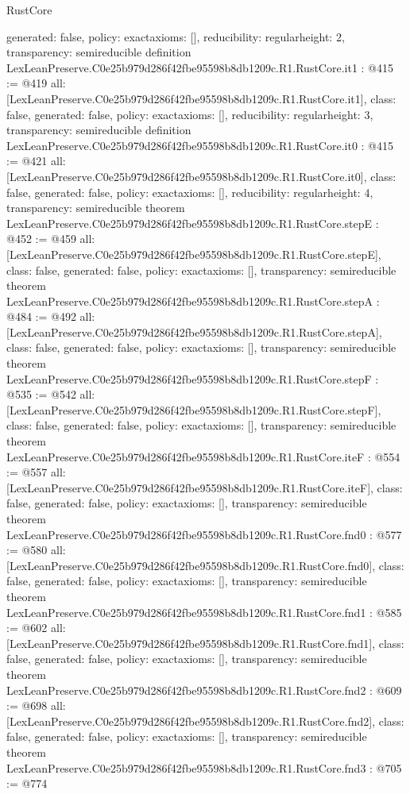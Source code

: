 \begin{lexlean}{RustCore}
\begin{coremodule}
{  generated: false,
  policy: exact{axioms: []},
  reducibility: regular{height: 2},
  transparency: semireducible
}
definition LexLeanPreserve.C0e25b979d286f42fbe95598b8db1209c.R1.RustCore.it1 : @415 := @419 {
  all: [LexLeanPreserve.C0e25b979d286f42fbe95598b8db1209c.R1.RustCore.it1],
  class: false,
  generated: false,
  policy: exact{axioms: []},
  reducibility: regular{height: 3},
  transparency: semireducible
}
definition LexLeanPreserve.C0e25b979d286f42fbe95598b8db1209c.R1.RustCore.it0 : @415 := @421 {
  all: [LexLeanPreserve.C0e25b979d286f42fbe95598b8db1209c.R1.RustCore.it0],
  class: false,
  generated: false,
  policy: exact{axioms: []},
  reducibility: regular{height: 4},
  transparency: semireducible
}
theorem LexLeanPreserve.C0e25b979d286f42fbe95598b8db1209c.R1.RustCore.stepE : @452 := @459 {
  all: [LexLeanPreserve.C0e25b979d286f42fbe95598b8db1209c.R1.RustCore.stepE],
  class: false,
  generated: false,
  policy: exact{axioms: []},
  transparency: semireducible
}
theorem LexLeanPreserve.C0e25b979d286f42fbe95598b8db1209c.R1.RustCore.stepA : @484 := @492 {
  all: [LexLeanPreserve.C0e25b979d286f42fbe95598b8db1209c.R1.RustCore.stepA],
  class: false,
  generated: false,
  policy: exact{axioms: []},
  transparency: semireducible
}
theorem LexLeanPreserve.C0e25b979d286f42fbe95598b8db1209c.R1.RustCore.stepF : @535 := @542 {
  all: [LexLeanPreserve.C0e25b979d286f42fbe95598b8db1209c.R1.RustCore.stepF],
  class: false,
  generated: false,
  policy: exact{axioms: []},
  transparency: semireducible
}
theorem LexLeanPreserve.C0e25b979d286f42fbe95598b8db1209c.R1.RustCore.iteF : @554 := @557 {
  all: [LexLeanPreserve.C0e25b979d286f42fbe95598b8db1209c.R1.RustCore.iteF],
  class: false,
  generated: false,
  policy: exact{axioms: []},
  transparency: semireducible
}
theorem LexLeanPreserve.C0e25b979d286f42fbe95598b8db1209c.R1.RustCore.fnd0 : @577 := @580 {
  all: [LexLeanPreserve.C0e25b979d286f42fbe95598b8db1209c.R1.RustCore.fnd0],
  class: false,
  generated: false,
  policy: exact{axioms: []},
  transparency: semireducible
}
theorem LexLeanPreserve.C0e25b979d286f42fbe95598b8db1209c.R1.RustCore.fnd1 : @585 := @602 {
  all: [LexLeanPreserve.C0e25b979d286f42fbe95598b8db1209c.R1.RustCore.fnd1],
  class: false,
  generated: false,
  policy: exact{axioms: []},
  transparency: semireducible
}
theorem LexLeanPreserve.C0e25b979d286f42fbe95598b8db1209c.R1.RustCore.fnd2 : @609 := @698 {
  all: [LexLeanPreserve.C0e25b979d286f42fbe95598b8db1209c.R1.RustCore.fnd2],
  class: false,
  generated: false,
  policy: exact{axioms: []},
  transparency: semireducible
}
theorem LexLeanPreserve.C0e25b979d286f42fbe95598b8db1209c.R1.RustCore.fnd3 : @705 := @774 {
}
\end{coremodule}
\end{lexlean}
